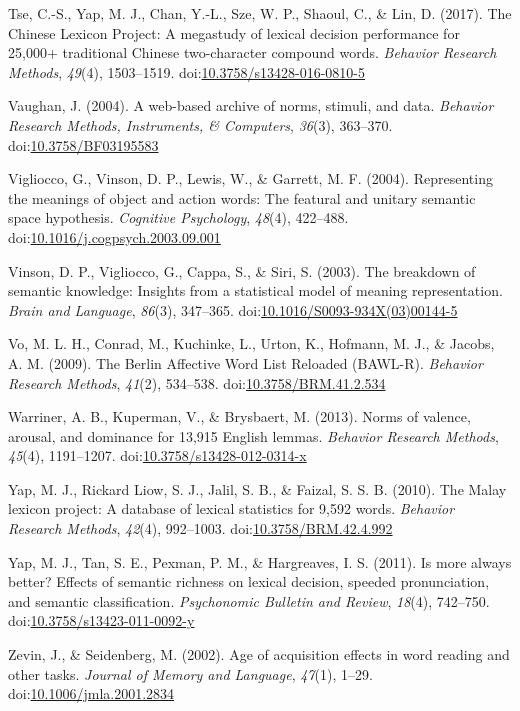 \documentclass[english,,man]{apa6}
\theoremstyle{definition}
\theoremstyle{definition}
\theoremstyle{definition}
\theoremstyle{remark}
\begin{document}
\leavevmode\hypertarget{ref-Tse2017}{}%
Tse, C.-S., Yap, M. J., Chan, Y.-L., Sze, W. P., Shaoul, C., \& Lin, D.
(2017). The Chinese Lexicon Project: A megastudy of lexical decision
performance for 25,000+ traditional Chinese two-character compound
words. \emph{Behavior Research Methods}, \emph{49}(4), 1503--1519.
doi:\href{https://doi.org/10.3758/s13428-016-0810-5}{10.3758/s13428-016-0810-5}

\leavevmode\hypertarget{ref-Vaughan2004}{}%
Vaughan, J. (2004). A web-based archive of norms, stimuli, and data.
\emph{Behavior Research Methods, Instruments, \& Computers},
\emph{36}(3), 363--370.
doi:\href{https://doi.org/10.3758/BF03195583}{10.3758/BF03195583}

\leavevmode\hypertarget{ref-Vigliocco2004}{}%
Vigliocco, G., Vinson, D. P., Lewis, W., \& Garrett, M. F. (2004).
Representing the meanings of object and action words: The featural and
unitary semantic space hypothesis. \emph{Cognitive Psychology},
\emph{48}(4), 422--488.
doi:\href{https://doi.org/10.1016/j.cogpsych.2003.09.001}{10.1016/j.cogpsych.2003.09.001}

\leavevmode\hypertarget{ref-Vinson2003}{}%
Vinson, D. P., Vigliocco, G., Cappa, S., \& Siri, S. (2003). The
breakdown of semantic knowledge: Insights from a statistical model of
meaning representation. \emph{Brain and Language}, \emph{86}(3),
347--365.
doi:\href{https://doi.org/10.1016/S0093-934X(03)00144-5}{10.1016/S0093-934X(03)00144-5}

\leavevmode\hypertarget{ref-Vo2009}{}%
Vo, M. L. H., Conrad, M., Kuchinke, L., Urton, K., Hofmann, M. J., \&
Jacobs, A. M. (2009). The Berlin Affective Word List Reloaded (BAWL-R).
\emph{Behavior Research Methods}, \emph{41}(2), 534--538.
doi:\href{https://doi.org/10.3758/BRM.41.2.534}{10.3758/BRM.41.2.534}

\leavevmode\hypertarget{ref-Warriner2013}{}%
Warriner, A. B., Kuperman, V., \& Brysbaert, M. (2013). Norms of
valence, arousal, and dominance for 13,915 English lemmas.
\emph{Behavior Research Methods}, \emph{45}(4), 1191--1207.
doi:\href{https://doi.org/10.3758/s13428-012-0314-x}{10.3758/s13428-012-0314-x}

\leavevmode\hypertarget{ref-Yap2010}{}%
Yap, M. J., Rickard Liow, S. J., Jalil, S. B., \& Faizal, S. S. B.
(2010). The Malay lexicon project: A database of lexical statistics for
9,592 words. \emph{Behavior Research Methods}, \emph{42}(4), 992--1003.
doi:\href{https://doi.org/10.3758/BRM.42.4.992}{10.3758/BRM.42.4.992}

\leavevmode\hypertarget{ref-Yap2011}{}%
Yap, M. J., Tan, S. E., Pexman, P. M., \& Hargreaves, I. S. (2011). Is
more always better? Effects of semantic richness on lexical decision,
speeded pronunciation, and semantic classification. \emph{Psychonomic
Bulletin and Review}, \emph{18}(4), 742--750.
doi:\href{https://doi.org/10.3758/s13423-011-0092-y}{10.3758/s13423-011-0092-y}

\leavevmode\hypertarget{ref-Zevin2002}{}%
Zevin, J., \& Seidenberg, M. (2002). Age of acquisition effects in word
reading and other tasks. \emph{Journal of Memory and Language},
\emph{47}(1), 1--29.
doi:\href{https://doi.org/10.1006/jmla.2001.2834}{10.1006/jmla.2001.2834}
\end{document}
